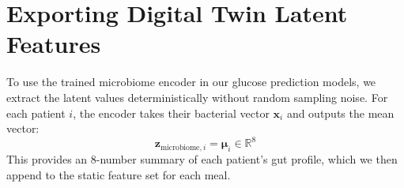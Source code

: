 \section{Exporting Digital Twin Latent Features}
To use the trained microbiome encoder in our glucose prediction models, we extract the latent values deterministically without random sampling noise. For each patient $i$, the encoder takes their bacterial vector $\mathbf{x}_i$ and outputs the mean vector:
\begin{equation}
    \mathbf{z}_{\text{microbiome}, i} = \boldsymbol{\mu}_i \in \mathbb{R}^8
\end{equation}
This provides an 8-number summary of each patient's gut profile, which we then append to the static feature set for each meal.
